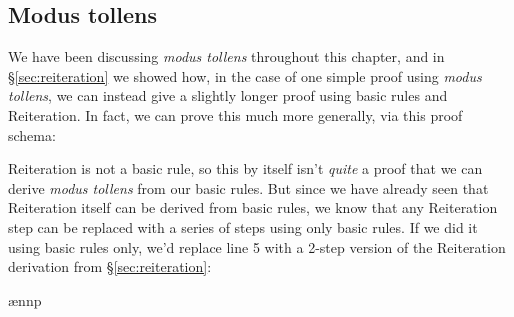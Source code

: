 



\subsection{Modus tollens}

We have been discussing \emph{modus tollens} throughout this chapter, and in \S\ref{sec:reiteration} we showed how, in the case of one simple proof using \emph{modus tollens}, we can instead give a slightly longer proof using basic rules and Reiteration. In fact, we can prove this much more generally, via this proof schema:

\begin{ndproof}
	 \want{\enot \metaB{}}
	\open
		 
	\close
\end{ndproof}

Reiteration is not a basic rule, so this by itself isn't \emph{quite} a proof that we can derive \emph{modus tollens} from our basic rules. But since we have already seen that Reiteration itself can be derived from basic rules, we know that any Reiteration step can be replaced with a series of steps using only basic rules. If we did it using basic rules only, we'd replace line 5 with a 2-step version of the Reiteration derivation from \S\ref{sec:reiteration}:

\begin{ndproof}
	 \want{\enot \metaB{}}
	\open
		 
		\ae{nnp}		
	\close
\end{ndproof}

